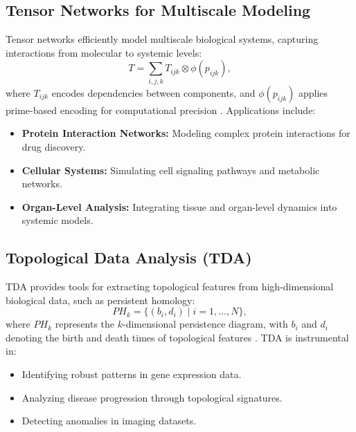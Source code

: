 \documentclass{article}
\theoremstyle{plain}
\begin{document}
\subsection{Tensor Networks for Multiscale Modeling}
Tensor networks efficiently model multiscale biological systems, capturing interactions from molecular to systemic levels:
\begin{equation}
T = \sum_{i,j,k} T_{ijk} \otimes \phi(p_{ijk}),
\end{equation}
where $T_{ijk}$ encodes dependencies between components, and $\phi(p_{ijk})$ applies prime-based encoding for computational precision \cite{tensorNetworks2022}. Applications include:
\begin{itemize}
    \item \textbf{Protein Interaction Networks:} Modeling complex protein interactions for drug discovery.
    \item \textbf{Cellular Systems:} Simulating cell signaling pathways and metabolic networks.
    \item \textbf{Organ-Level Analysis:} Integrating tissue and organ-level dynamics into systemic models.
\end{itemize}

\subsection{Topological Data Analysis (TDA)}
TDA provides tools for extracting topological features from high-dimensional biological data, such as persistent homology:
\begin{equation}
PH_k = \{(b_i, d_i) \mid i = 1, \dots, N\},
\end{equation}
where $PH_k$ represents the $k$-dimensional persistence diagram, with $b_i$ and $d_i$ denoting the birth and death times of topological features \cite{tda2023}. TDA is instrumental in:
\begin{itemize}
    \item Identifying robust patterns in gene expression data.
    \item Analyzing disease progression through topological signatures.
    \item Detecting anomalies in imaging datasets.
\end{itemize}
\end{document}
